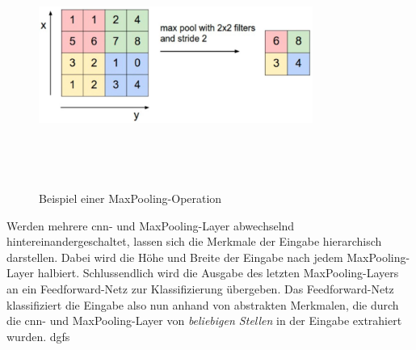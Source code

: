 \begin{figure}[h]
    \centering
    \includegraphics[width=0.8\textwidth,height=8cm,keepaspectratio=true]{content/images/MaxPooling.png}
    \caption{Beispiel einer MaxPooling-Operation \cite{6S191CNN}}
    \label{fig:MaxPooling}
\end{figure}

Werden mehrere \acrshort{cnn}- und MaxPooling-Layer abwechselnd hintereinandergeschaltet, lassen sich die Merkmale der Eingabe hierarchisch darstellen.
Dabei wird die Höhe und Breite der Eingabe nach jedem MaxPooling-Layer halbiert.
Schlussendlich wird die Ausgabe des letzten MaxPooling-Layers an ein Feedforward-Netz zur Klassifizierung übergeben.
Das Feedforward-Netz klassifiziert die Eingabe also nun anhand von abstrakten Merkmalen, die durch die \acrshort{cnn}- und MaxPooling-Layer von \emph{beliebigen Stellen} in der Eingabe extrahiert wurden.
dgfs